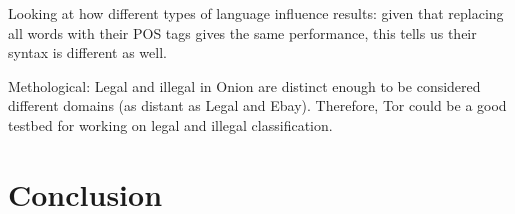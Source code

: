 \documentclass[11pt,a4paper]{article}
\begin{document}
Looking at how different types of language influence results: given that replacing all words with their POS tags gives
the same performance, this tells us their syntax is different as well.

Methological: Legal and illegal in Onion are distinct enough to be considered different domains (as distant as Legal and Ebay). 
Therefore, Tor could be a good testbed for working on legal and illegal classification.


\section{Conclusion}
 














\end{document}
